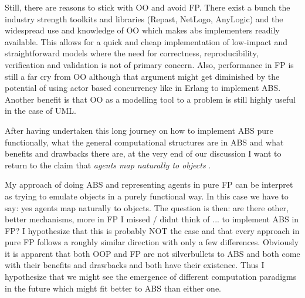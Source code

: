 Still, there are reasons to stick with OO and avoid FP. There exist a bunch the industry strength toolkits and libraries (Repast, NetLogo, AnyLogic) and the widespread use and knowledge of OO which makes abs implementers readily available. This allows for a quick and cheap implementation of low-impact and straightforward models where the need for correctness, reproducibility, verification and validation is not of primary concern. Also, performance in FP is still a far cry from OO although that argument might get diminished by the potential of using actor based concurrency like in Erlang to implement ABS. Another benefit is that OO as a modelling tool to a problem is still highly useful in the case of UML. %

\medskip

After having undertaken this long journey on how to implement ABS pure functionally, what the general computational structures are in ABS and what benefits and drawbacks there are, at the very end of our discussion I want to return to the claim that \textit{agents map naturally to objects} \cite{north_managing_2007}.

My approach of doing ABS and representing agents in pure FP can be interpret as trying to emulate objects in a purely functional way. In this case we have to say: yes agents map naturally to objects. The question is then: are there other, better mechanisms, more in FP I missed / didnt think of ... to implement ABS in FP? I hypothesize that this is probably NOT the case and that every approach in pure FP follows a roughly similar direction with only a few differences. Obviously it is apparent that both OOP and FP are not silverbullets to ABS and both come with their benefits and drawbacks and both have their existence. Thus I hypothesize that we might see the emergence of different computation paradigms in the future which might fit better to ABS than either one.

